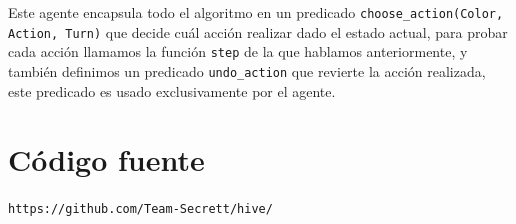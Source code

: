 \documentclass[a4paper,11pt]{article}
\begin{document}
Este agente encapsula todo el algoritmo en un predicado \verb+choose_action(Color, Action, Turn)+ que decide cu\'al acci\'on realizar dado el estado actual, para probar cada acci\'on llamamos la funci\'on \verb+step+ de la que hablamos anteriormente, y tambi\'en definimos un predicado \verb+undo_action+ que revierte la acci\'on realizada, este predicado es usado exclusivamente por el agente.

\section{C\'odigo fuente}

\verb+https://github.com/Team-Secrett/hive/+
\end{document}
